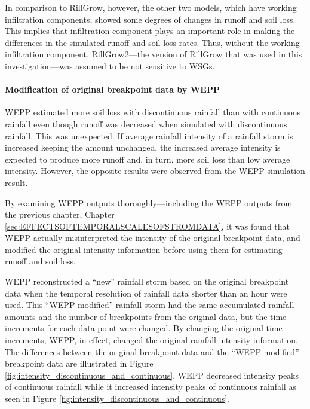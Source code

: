 In comparison to RillGrow, however, the other two models, which have working
infiltration components, showed some degrees of changes in runoff and soil loss.
This implies that infiltration component plays an important role in making the
differences in the simulated runoff and soil loss rates. Thus, without the
working infiltration component, RillGrow2---the version of RillGrow that was
used in this investigation---was assumed to be not sensitive to WSGs.


\paragraph{Modification of original breakpoint data by WEPP}
\label{sec:WEPPModificationofBP} WEPP estimated more
soil loss with discontinuous rainfall than with continuous rainfall even though
runoff was decreased when simulated with discontinuous rainfall. This was
unexpected. If average rainfall intensity of a rainfall storm is
increased keeping the amount unchanged, the increased average intensity is
expected to produce more runoff and, in turn, more soil loss than low average
intensity. However, the opposite results were observed from the WEPP simulation
result.

By examining WEPP outputs thoroughly---including the WEPP outputs from
the previous chapter, Chapter \ref{sec:EFFECTSOFTEMPORALSCALESOFSTROMDATA}, it
was found that WEPP actually misinterpreted the intensity of the original
breakpoint data, and modified the original intensity
information before using them for estimating runoff and soil loss.

WEPP reconstructed a ``new'' rainfall storm based on the original breakpoint
data when the temporal resolution of rainfall data shorter than an hour were used.
This ``WEPP-modified'' rainfall storm had the same accumulated rainfall
amounts and the number of breakpoints from the original data, but the time
increments for each data point were changed. By changing the original time
increments, WEPP, in effect, changed the original rainfall intensity
information. The differences between the original breakpoint data and the
``WEPP-modified'' breakpoint data are illustrated in Figure
\ref{fig:intensity_discontinuous_and_continuous}. WEPP decreased intensity peaks
of continuous rainfall while it increased intensity peaks of continuous rainfall
as seen in Figure \ref{fig:intensity_discontinuous_and_continuous}.

